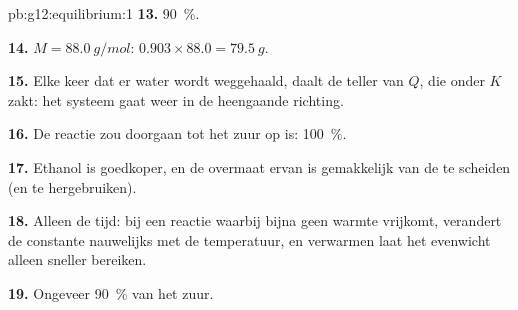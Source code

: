 \begin{solution}{pb:g12:equilibrium:1}
\textbf{13.} \qty{90}{\percent}.

\textbf{14.} $M = \qty{88.0}{g/mol}$: $0.903 \times 88.0 = \qty{79.5}{g}$.

\textbf{15.} Elke keer dat er water wordt weggehaald, daalt de teller van
$Q$, die onder $K$ zakt: het systeem gaat weer in de heengaande richting.

\textbf{16.} De reactie zou doorgaan tot het zuur op is:
\qty{100}{\percent}.

\textbf{17.} Ethanol is goedkoper, en de overmaat ervan is gemakkelijk van
de  te scheiden (en te hergebruiken).

\textbf{18.} Alleen de tijd: bij een reactie waarbij bijna geen warmte
vrijkomt, verandert de constante nauwelijks met de temperatuur, en
verwarmen laat het evenwicht alleen sneller bereiken.

\textbf{19.} Ongeveer \qty{90}{\percent} van het zuur.
\end{solution}
